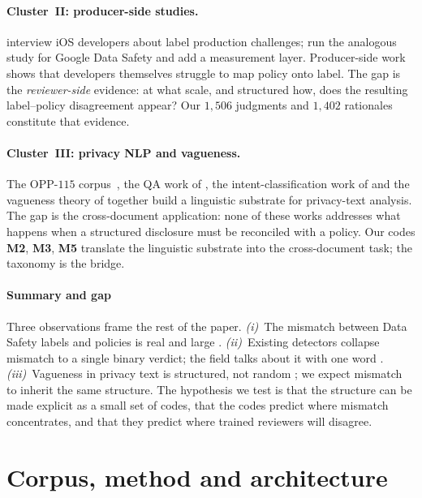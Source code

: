\documentclass[11pt,a4paper]{article}
\newcommand{\code}[1]{\textsf{\textbf{#1}}}
\begin{document}
\paragraph{Cluster~II: producer-side studies.}
\citet{li2022understanding} interview iOS developers about label
production challenges; \citet{khandelwal2024unpacking} run the
analogous study for Google Data Safety and add a measurement layer.
Producer-side work shows that developers themselves struggle to map
policy onto label. The gap is the \emph{reviewer-side} evidence: at
what scale, and structured how, does the resulting label--policy
disagreement appear? Our $1{,}506$ judgments and $1{,}402$ rationales
constitute that evidence.

\paragraph{Cluster~III: privacy NLP and vagueness.}
The OPP-$115$ corpus~\citep{wilson2016creation}, the QA work of
\citet{ravichander2019question}, the intent-classification work of
\citet{ahmad2021intent} and the vagueness theory of
\citet{bhatia2016theory} together build a linguistic substrate for
privacy-text analysis. The gap is the cross-document application:
none of these works addresses what happens when a structured
disclosure must be reconciled with a policy. Our codes \code{M2},
\code{M3}, \code{M5} translate the linguistic substrate into the
cross-document task; the taxonomy is the bridge.

\paragraph{Summary and gap}
Three observations frame the rest of the paper.
\emph{(i)}~The mismatch between Data Safety labels and policies is real
and large \citep{xiao2023lalaine,khandelwal2024unpacking}.
\emph{(ii)}~Existing detectors collapse mismatch to a single binary
verdict; the field talks about it with one word
\citep{andow2019policylint,andow2020policheck,bui2023detection}.
\emph{(iii)}~Vagueness in privacy text is structured, not random
\citep{bhatia2016theory,wilson2016creation}; we expect mismatch to
inherit the same structure. The hypothesis we test is that the
structure can be made explicit as a small set of codes, that the codes
predict where mismatch concentrates, and that they predict where
trained reviewers will disagree.

\section{Corpus, method and architecture}\label{sec:data}
\end{document}
